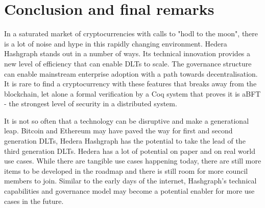 \section{Conclusion and final remarks}

In a saturated market of cryptocurrencies with calls to "hodl to the moon", there is a lot of noise and hype in this rapidly changing environment. Hedera Hashgraph stands out in a number of ways. Its technical innovation provides a new level of efficiency that can enable DLTs to scale. The governance structure can enable mainstream enterprise adoption with a path towards decentralisation. It is rare to find a cryptocurrency with these features that breaks away from the blockchain, let alone a formal verification by a Coq system that proves it is aBFT - the strongest level of security in a distributed system.

It is not so often that a technology can be disruptive and make a generational leap. Bitcoin and Ethereum may have paved the way for first and second generation DLTs, Hedera Hashgraph has the potential to take the lead of the third generation DLTs. Hedera has a lot of potential on paper and on real world use cases. While there are tangible use cases happening today, there are still more items to be developed in the roadmap and there is still room for more council members to join. Similar to the early days of the internet, Hashgraph's technical capabilities and governance model may become a potential enabler for more use cases in the future.
